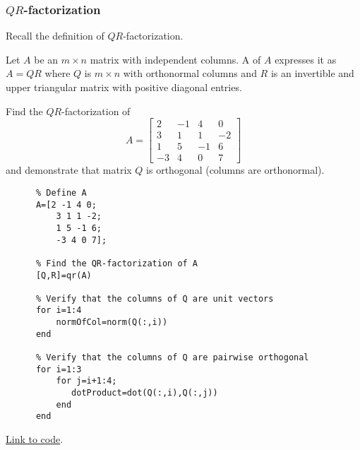 \documentclass{ximera}
\begin{document}
\subsubsection*{$QR$-factorization}

Recall the definition of $QR$-factorization.
\begin{definition}[\ref{def:QR-factorization}]
Let $A$ be an $m \times n$ matrix with independent columns. A  of $A$ expresses it as $A = QR$ where $Q$ is $m \times n$ with orthonormal columns and $R$ is an invertible and upper triangular matrix with positive diagonal entries.
\end{definition}

\begin{example}\label{ex:qrOrthonormalQ}
Find the $QR$-factorization of 
$$A=\begin{bmatrix}2 & -1 & 4 & 0\\
    3 & 1 & 1 & -2\\
    1 & 5 & -1 & 6\\
    -3 & 4 & 0 & 7\end{bmatrix}$$
and demonstrate that matrix $Q$ is orthogonal (columns are orthonormal).     
\begin{explanation}
    \begin{verbatim}
      % Define A
      A=[2 -1 4 0;
          3 1 1 -2;
          1 5 -1 6;
          -3 4 0 7];
      
      % Find the QR-factorization of A
      [Q,R]=qr(A)
      
      % Verify that the columns of Q are unit vectors
      for i=1:4
          normOfCol=norm(Q(:,i))
      end    
      
      % Verify that the columns of Q are pairwise orthogonal
      for i=1:3
          for j=i+1:4;
             dotProduct=dot(Q(:,i),Q(:,j))
          end
      end
    \end{verbatim}
  
\href{https://sagecell.sagemath.org/?z=eJyNTz1PwzAQ3SPlP9xSKRWJ1DQFpCIPEYgV0oGl6mAlNr0q9ZWLA4Jfz10TiZXnwffkex9ewJPzGBzUaVKb_RqKEjawekgTEFRQyinWMy3hVt_vZlpUugr3B-FpsoBnDB3Eo4NmV3jbRmL8sREpAHn13zf57mA-OKuXk-DNMfpvkdh41bXUj-cw6HoDlh2MASN8OrUa0sQTA5pyu5niA_H5xT9Sb3TKmmyb41KcnbQQ_DPiYpG_cHBAHI_0TsH2f0nVlKT0ZPBGouevCzqKr0zd2EYj4xyf63XSFroiTa51fgHN8l_0&lang=octave&interacts=eJyLjgUAARUAuQ==}{Link to code}.
\end{explanation}  

\end{example}
\end{document}
